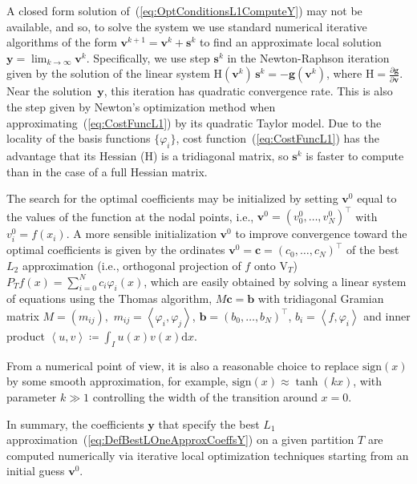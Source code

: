 \documentclass[a4paper,english]{IEEEtran}
\begin{document}
A closed form solution of~(\ref{eq:OptConditionsL1ComputeY}) may
not be available, and so, to solve the system we use standard numerical
iterative algorithms of the form ${\mathbf{v}}^{k+1}={\mathbf{v}}^{k}+{\mathbf{s}}^{k}$ to
find an approximate local solution ${\mathbf{y}}=\lim_{k\to\infty}{\mathbf{v}}^{k}$.
Specifically, we use step ${\mathbf{s}}^{k}$ in the Newton-Raphson iteration
given by the solution of the linear system ${\mbox{H}}({\mathbf{v}}^{k})\,{\mathbf{s}}^{k}=-{\mathbf{g}}({\mathbf{v}}^{k})$,
where ${\mbox{H}}=\frac{\partial{\mathbf{g}}}{\partial{\mathbf{v}}}$. Near the solution~${\mathbf{y}}$,
this iteration has quadratic convergence rate. This is also the step
given by Newton's optimization method when approximating~(\ref{eq:CostFuncL1})
by its quadratic Taylor model. Due to the locality of the basis functions
$\{\varphi_{i}\}$, cost function~(\ref{eq:CostFuncL1}) has the
advantage that its Hessian (${\mbox{H}}$) is a tridiagonal matrix, so ${\mathbf{s}}^{k}$
is faster to compute than in the case of a full Hessian matrix. 

The search for the optimal coefficients may be initialized by setting
${\mathbf{v}}^{0}$ equal to the values of the function at the nodal points,
i.e., ${\mathbf{v}}^{0}=(v_{0}^{0},\ldots,v_{N}^{0})^{\top}$ with $v_{i}^{0}=f(x_{i})$.
A more sensible initialization ${\mathbf{v}}^{0}$ to improve convergence toward
the optimal coefficients is given by the ordinates ${\mathbf{v}}^{0}=\mathbf{c}=(c_{0},\ldots,c_{N})^{\top}$
of the best ${L_{2}}$ approximation (i.e., orthogonal projection of
$f$ onto ${\mathrm{V}_{T}}$) ${P_{T}}{f}(x)=\sum_{i=0}^{N}c_{i}\varphi_{i}(x)$,
which are easily obtained by solving a linear system of equations
using the Thomas algorithm, $M\mathbf{c}=\mathbf{b}$ with tridiagonal
Gramian matrix $M=(m_{ij}),$ $m_{ij}={\left\langle {\varphi_{i}},{\varphi_{j}}\right\rangle }$,
$\mathbf{b}=(b_{0},\ldots,b_{N})^{\top}$, $b_{i}={\left\langle f,{\varphi_{i}}\right\rangle }$
and inner product ${\left\langle u,v\right\rangle }\coloneqq\int_{I}u(x)v(x){\mathrm{d}} x$.

From a numerical point of view, it is also a reasonable choice to
replace ${\text{sign}}(x)$ by some smooth approximation, for example, ${\text{sign}}(x)\approx\tanh(kx)$,
with parameter $k\gg1$ controlling the width of the transition around
$x=0$. 

In summary, the coefficients ${\mathbf{y}}$ that specify the best ${L_{1}}$
approximation~(\ref{eq:DefBestLOneApproxCoeffsY}) on a given partition
${T}$ are computed numerically via iterative local optimization
techniques starting from an initial guess ${\mathbf{v}}^{0}$.
\end{document}
